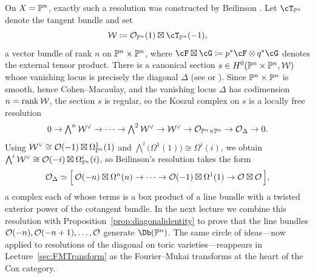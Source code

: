 \documentclass{amsart}
\begin{document}
On $X=\mathbb P^n$, exactly such a resolution was constructed by Beilinson \cite{Beilinson78}. Let $\cT_{\PP^n}$ denote the tangent bundle and set
\[ \mathcal W\ce \cO_{\PP^n}(1)\boxtimes \cT_{\PP^n}(-1), \]
a vector bundle of rank $n$ on $\mathbb P^n\times\mathbb P^n$, where $\cF\boxtimes\cG\ce p^*\cF\otimes q^*\cG$ denotes the external tensor product.  There is a canonical section $s\in H^0(\mathbb P^n\times\mathbb P^n,\mathcal W)$ whose vanishing locus is precisely the diagonal $\Delta$ (see \cite[\S3]{Caldararu05} or \cite[\S8.3]{Huybrechts2006}).
Since $\mathbb P^n\times\mathbb P^n$ is smooth, hence Cohen--Macaulay, and the vanishing locus $\Delta$ has codimension $n=\operatorname{rank}\mathcal W$, the section $s$ is regular, so the Koszul complex on $s$ is a locally free resolution
\[ 0\to \textstyle\bigwedge^n\mathcal W^\vee \to \cdots\to \bigwedge^2\mathcal W^\vee\to \mathcal W^\vee \to {\mathcal O}_{\mathbb P^n\times\mathbb P^n}\to {\mathcal O}_\Delta\to 0. \]
Using $\mathcal W^\vee\cong {\mathcal O}(-1)\boxtimes \Omega^1_{\mathbb P^n}(1)$ and $\bigwedge^i\bigl(\Omega^1(1)\bigr)\cong \Omega^i(i)$, we obtain $\bigwedge^i\mathcal W^\vee \cong {\mathcal O}(-i)\boxtimes \Omega^i_{\mathbb P^n}(i)$, so Beilinson's resolution takes the form
\[ {\mathcal O}_\Delta \simeq \Big[\, {\mathcal O}(-n)\boxtimes\Omega^n(n)\to \cdots\to {\mathcal O}(-1)\boxtimes\Omega^1(1)\to {\mathcal O}\boxtimes{\mathcal O}\,\Big], \]
a complex each of whose terms is a box product of a line bundle with a twisted exterior power of the cotangent bundle. In the next lecture we combine this resolution with Proposition~\ref{prop:diagonalidentity} to prove that the line bundles ${\mathcal O}(-n),{\mathcal O}(-n+1),\dots,{\mathcal O}$ generate $\Db(\PP^n)$. The same circle of ideas---now applied to resolutions of the diagonal on toric varieties---reappears in Lecture~\ref{sec:FMTransform} as the Fourier--Mukai transforms at the heart of the Cox category.


\end{document}
